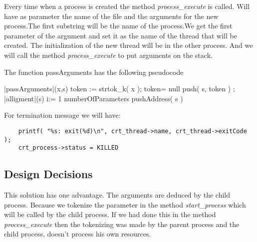 	  Every time when a process is created the method \textit{process\_execute} is called. Will have as parameter the name of the file and the arguments for the new process.The first substring will be the name of the process.We get the first parameter of the argument and set it as the name of the thread that will be created. The initialization of the new thread will be in the other process. And we will call the method \textit{process\_execute} to put arguments on the stack.

	  The function passArguments has the following pseudocode


    \begin{program}
    \BEGIN %
    \PROC |passArguments|(x,s) \BODY
              \DO
		token := strtok\_k( x );
		\IF token= null 
		  \THEN \EXIT 
		  \ELSE push( s, token )   
		\FI;
	      \OD
	      |alligment|(s)
              \FOR i:= 1 \TO numberOfParameters  \DO
		pushAddress( s ) \OD
     \ENDPROC
    \END
    \end{program}

    For termination message we will have:

    \begin{lstlisting}
	printf( "%s: exit(%d)\n", crt_thread->name, crt_thread->exitCode );
	crt_process->status = KILLED
    \end{lstlisting}


    \subsection{Design Decisions}

	This solution has one advantage. The arguments are deduced by the child process. Because we tokenize the parameter in the method \textit{start\_process} which will be called by the child process. If we had done this in the method \textit{process\_execute} then the tokenizing was made by the parent process and the child process, doesn't process his own resources.

